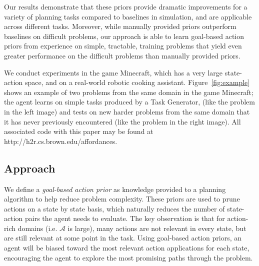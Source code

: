 \documentclass[11pt]{article}
\begin{document}
Our results demonstrate
that these priors provide dramatic improvements for a variety of
planning tasks compared to baselines in simulation, and are applicable
across different tasks.  Moreover, while manually provided
priors outperform baselines on difficult problems, our approach
is able to learn goal-based action priors from experience on simple, tractable, 
training problems that yield even greater performance on the difficult problems
than manually provided priors.

We conduct experiments in
the game Minecraft, which has a very large state-action space, and on
a real-world robotic cooking assistant.  Figure~\ref{fig:example}
shows an example of two problems from the same domain in the game
Minecraft; the agent learns on simple tasks produced by a Task Generator,
(like the problem in the left image) and tests
on new harder problems from the same domain that it has never previously
encountered (like the problem in the right image). All associated code with this paper may be found at
http://h2r.cs.brown.edu/affordances.


\subsection{Approach}
We define a {\it goal-based action prior} as knowledge provided to a planning algorithm to help reduce problem complexity. These priors are used to prune actions on a state by state basis, which naturally reduces the number of state-action pairs the agent needs to evaluate. The key observation is that for action-rich domains (i.e. $\mathcal{A}$ is large), many actions are not relevant in every state, but are still relevant at some point in the task. Using goal-based action priors, an agent will be biased toward the most relevant action applications for each state, encouraging the agent to explore the most promising paths through the problem.
\end{document}
